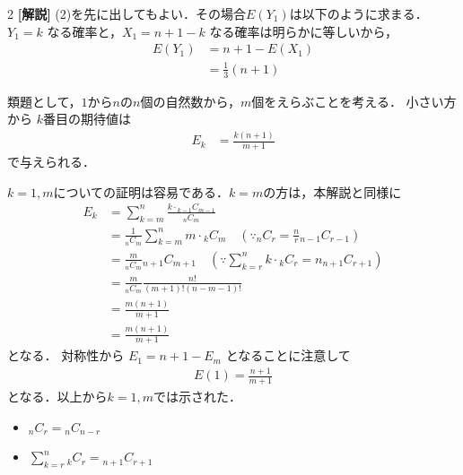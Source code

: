 \documentclass[../../../../main.tex]{subfiles}
\begin{document}
\begin{multicols}{2}
  \vspace{10pt}
  {\bf[解説]}
  (2)を先に出してもよい．その場合$E(Y_1)$は以下のように求まる．
  $Y_1=k$ なる確率と，$X_1=n+1-k$ なる確率は明らかに等しいから，
  \begin{align*}
    E(Y_1)
     & = n+1 - E(X_1)     \\
     & = \frac{1}{3}(n+1)
  \end{align*}

  類題として，$1$から$n$の$n$個の自然数から，$m$個をえらぶことを考える．
  小さい方から $k$番目の期待値は
  \begin{align*}
    E_k & = \frac{k(n+1)}{m+1}
  \end{align*}
  で与えられる．
  \begin{center}
  \end{center}

  $k=1, m$についての証明は容易である．$k=m$の方は，本解説と同様に
  \begin{align*}
    E_k
     & = \sum_{k=m}^n \frac{k \cdot {}_{k-1}C_{m-1}}{{}_n C_m}                                                        \\
     & = \frac{1}{{}_n C_m} \sum_{k=m}^n m \cdot {}_{k}C_{m} \quad (\because {}_n C_r = \frac{n}{r} {}_{n-1} C_{r-1}) \\
     & = \frac{m}{{}_n C_m} {}_{n+1}C_{m+1} \quad (\because \sum_{k=r}^n k \cdot {}_k C_r = n {}_{n+1} C_{r+1})       \\
     & = \frac{m}{{}_n C_m} \frac{n!}{(m+1)!(n-m-1)!}                                                                 \\ &= \frac{m(n+1)}{m+1} \\
     & = \frac{m(n+1)}{m+1}
  \end{align*}
  となる．
  対称性から $E_{1} = n+1-E_{m}$ となることに注意して
  \begin{align*}
    E(1) = \frac{n+1}{m+1}
  \end{align*}
  となる．以上から$k=1,m$では示された．


  \begin{itemize}
    \item ${}_n C_r = {}_{n} C_{n-r}$
    \item $\sum_{k=r}^n {}_k C_r = {}_{n+1} C_{r+1}$
  \end{itemize}



  \newpage
\end{multicols}
\end{document}
